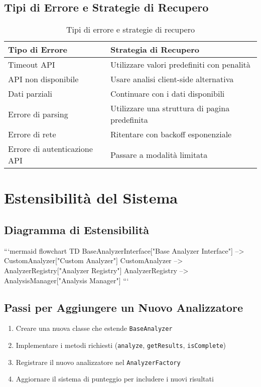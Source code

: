 \subsection{Tipi di Errore e Strategie di Recupero}
\begin{table}[H]
\centering
\begin{tabular}{|l|l|}
\hline
\textbf{Tipo di Errore} & \textbf{Strategia di Recupero} \\
\hline
Timeout API & Utilizzare valori predefiniti con penalità \\
\hline
API non disponibile & Usare analisi client-side alternativa \\
\hline
Dati parziali & Continuare con i dati disponibili \\
\hline
Errore di parsing & Utilizzare una struttura di pagina predefinita \\
\hline
Errore di rete & Ritentare con backoff esponenziale \\
\hline
Errore di autenticazione API & Passare a modalità limitata \\
\hline
\end{tabular}
\caption{Tipi di errore e strategie di recupero}
\label{table:error-recovery}
\end{table}

\section{Estensibilità del Sistema}

\subsection{Diagramma di Estensibilità}

```mermaid
flowchart TD
    BaseAnalyzerInterface["Base Analyzer Interface"] --> CustomAnalyzer["Custom Analyzer"]
    CustomAnalyzer --> AnalyzerRegistry["Analyzer Registry"]
    AnalyzerRegistry --> AnalysisManager["Analysis Manager"]
```    

\subsection{Passi per Aggiungere un Nuovo Analizzatore}
\begin{enumerate}
    \item Creare una nuova classe che estende \texttt{BaseAnalyzer}
    \item Implementare i metodi richiesti (\texttt{analyze}, \texttt{getResults}, \texttt{isComplete})
    \item Registrare il nuovo analizzatore nel \texttt{AnalyzerFactory}
    \item Aggiornare il sistema di punteggio per includere i nuovi risultati
\end{enumerate}

